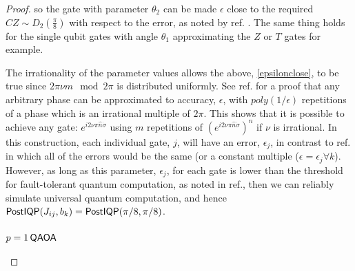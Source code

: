 \begin{proof}
so the gate with parameter $\theta_2$ can be made $\epsilon$ close to the required $CZ \sim D_2(\frac{\pi}{8})$ with respect to the error, as noted by ref. . The same thing holds for the single qubit gates with angle $\theta_1$ approximating the $Z$ or $T$ gates for example.

The irrationality of the parameter values allows the above, \eqref{epsilonclose}, to be true since $2\pi\nu m\mod 2\pi$ is distributed uniformly. See ref. for a proof that any arbitrary phase can be approximated to accuracy, $\epsilon$, with $poly(1/\epsilon)$ repetitions of a phase which is an irrational multiple of $2\pi$. This shows that it is possible to achieve any gate: $e^{i2\nu\pi \hat{n}\dot\sigma}$ using $m$ repetitions of $(e^{i2\nu\pi \hat{n}\dot\sigma})^n$ if $\nu$ is irrational. In this construction, each individual gate, $j$, will have an error, $\epsilon_j$, in contrast to ref. in which all of the errors would be the same (or a constant multiple ($\epsilon = \epsilon_j \forall k$). However, as long as this parameter, $\epsilon_j$,  for each gate is lower than the threshold for fault-tolerant quantum computation, as noted in ref., then we can reliably simulate universal quantum computation, and hence $\operatorname{\textsf{PostIQP}}( J_{ij}, b_{k}) = \operatorname{\textsf{PostIQP}}(\pi/8, \pi/8)$.

\subsubsection*{\texorpdfstring{$p = 1 \operatorname{\textsf{QAOA}}$}{pQAOA} \label{appa:hardnessqaoaproof}}


\end{proof}
